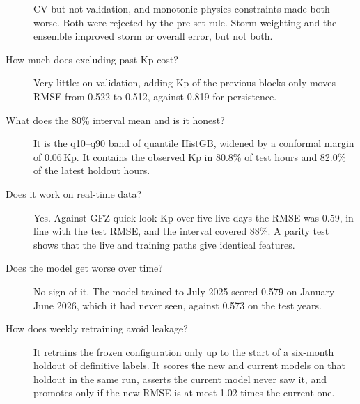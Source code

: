 \documentclass[11pt,a4paper]{article}
\begin{document}
\begin{description}
CV but not validation, and monotonic physics constraints made both worse. Both were rejected by the pre-set rule.
Storm weighting and the ensemble improved storm or overall error, but not both.
\item[How much does excluding past Kp cost?] Very little: on validation, adding Kp of the previous blocks only
moves RMSE from 0.522 to 0.512, against 0.819 for persistence.
\item[What does the 80\% interval mean and is it honest?] It is the q10--q90 band of quantile HistGB, widened by
a conformal margin of 0.06\,Kp. It contains the observed Kp in 80.8\% of test hours and 82.0\% of the latest
holdout hours.
\item[Does it work on real-time data?] Yes. Against GFZ quick-look Kp over five live days the RMSE was 0.59,
in line with the test RMSE, and the interval covered 88\%. A parity test shows that the live and training paths
give identical features.
\item[Does the model get worse over time?] No sign of it. The model trained to July 2025 scored 0.579 on
January--June 2026, which it had never seen, against 0.573 on the test years.
\item[How does weekly retraining avoid leakage?] It retrains the frozen configuration only up to the start of a
six-month holdout of definitive labels. It scores the new and current models on that holdout in the same run,
asserts the current model never saw it, and promotes only if the new RMSE is at most 1.02 times the current one.
\end{description}

\end{document}
